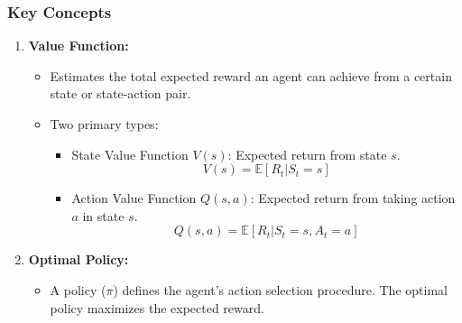 \documentclass[aspectratio=169]{beamer}
\begin{document}
\begin{frame}[fragile]
  \frametitle{Key Concepts}
  \begin{enumerate}
    \item \textbf{Value Function:}
      \begin{itemize}
        \item Estimates the total expected reward an agent can achieve from a certain state or state-action pair.
        \item Two primary types:
        \begin{itemize}
          \item State Value Function \(V(s)\): Expected return from state \(s\).
            \[
            V(s) = \mathbb{E}[R_t | S_t = s]
            \]
          \item Action Value Function \(Q(s, a)\): Expected return from taking action \(a\) in state \(s\).
            \[
            Q(s, a) = \mathbb{E}[R_t | S_t = s, A_t = a]
            \]
        \end{itemize}
      \end{itemize}

    \item \textbf{Optimal Policy:}
      \begin{itemize}
        \item A policy (\(\pi\)) defines the agent's action selection procedure. The optimal policy maximizes the expected reward.
      \end{itemize}
  \end{enumerate}
\end{frame}
\end{document}
